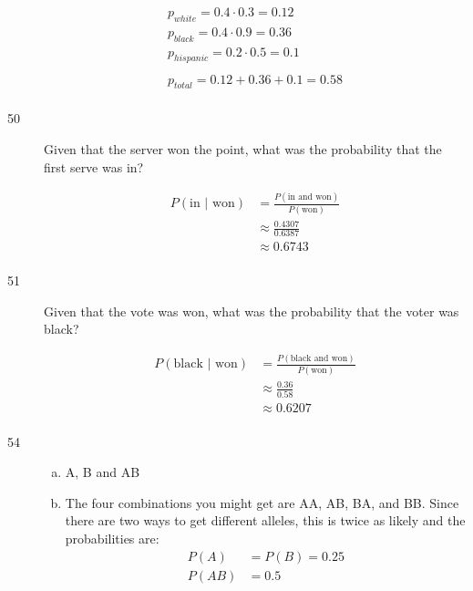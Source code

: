 \documentclass[letterpaper, landscape]{exam}
\begin{document}
\begin{description}
      \begin{align*}
        p_{white} = 0.4 \cdot 0.3 = 0.12 \\
        p_{black} = 0.4 \cdot 0.9 = 0.36 \\
        p_{hispanic} = 0.2 \cdot 0.5 = 0.1 \\
        \\
        p_{total} = 0.12 + 0.36 + 0.1 = \boxed{ 0.58 } \\
      \end{align*}

    \item[50]
      Given that the server won the point, what was the probability that the first
      serve was in?

      \begin{align*}
        P(\text{in } | \text{ won}) & = \frac{P(\text{in and won})}{P(\text{won})} \\
                    & \approx \frac{0.4307}{0.6387} \\
                    & \approx \boxed{ 0.6743 } \\
      \end{align*}

    \newpage

    \item[51]
      Given that the vote was won, what was the probability that the voter was black?

      \begin{align*}
        P(\text{black } | \text{ won}) & = \frac{P(\text{black and won})}{P(\text{won})} \\
                       & \approx \frac{0.36}{0.58} \\
                       & \approx \boxed{ 0.6207 } \\
      \end{align*}

    \item[54]
      \begin{enumerate}[(a)]
        \item A, B and AB

        \item
          The four combinations you might get are AA, AB, BA, and BB\@. Since there are 
          two ways to get different alleles, this is twice as likely and the probabilities
          are:
          \begin{align*}
            P(A)  & = P(B) = 0.25 \\
            P(AB) & = 0.5 \\
          \end{align*}
      \end{enumerate}


\end{description}
\end{document}
